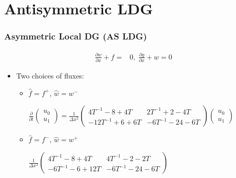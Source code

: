 \documentclass[serif,12pt]{beamer}
\begin{document}
\section{Antisymmetric LDG}
\begin{frame}
\frametitle{Asymmetric Local DG (AS LDG)}
\begin{align*}
	\frac{\partial w}{\partial x} + f =& 0,\; \frac{\partial g}{\partial x} + w = 0
\end{align*}
\begin{itemize}
	\item Two choices of fluxes:
	\begin{itemize}
		\item $\hat{f} = f^+$, $\hat{w} = w^-$\\
		\begin{center}
		$\frac{\partial}{\partial t}\left(\begin{array}{cc}u_0\\u_1
		\end{array}\right) = \frac{1}{\Delta x^2}\left(
		\begin{array}{cc}
		4T^{-1} -8+4 T & 2T^{-1}+2-4 T \\
		 -12 T^{-1} +6+6 T & -6 T^{-1} -24-6 T
		\end{array}\right)\left(\begin{array}{c}
		u_0 \\
		 u_1 
		\end{array}
		\right)$
		\end{center}
		\item $\hat{f} = f^-$, $\hat{w} = w^+$\\
		\begin{center}
		$\frac{1}{\Delta x^2}\left(
		\begin{array}{cc}
		4T^{-1} -8+4 T & 4T^{-1}-2-2 T \\
		 -6 T^{-1} -6+12 T & -6 T^{-1} -24-6 T
		\end{array}
		\right)$
		\end{center}
	\end{itemize}
\end{itemize}
\end{frame}
\end{document}
